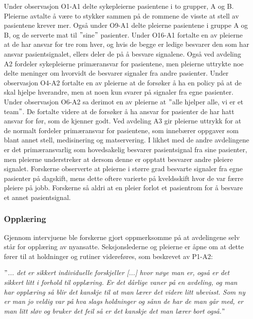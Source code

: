\noindent
Under observasjon O1-A1 delte sykepleierne pasientene i to grupper, A og B. Pleierne avtalte å være to stykker sammen på de rommene de visste at stell av pasientene krever mer. Også under O9-A1 delte pleierne pasientene i gruppe A og B, og de serverte mat til $"$sine$"$ pasienter. Under O16-A1 fortalte en av pleierne at de har ansvar for tre rom hver, og hvis de begge er ledige besvarer den som har ansvar pasientsignalet, ellers deler de på å besvare signalene. Også ved avdeling A2 fordeler sykepleierne primæransvar for pasientene, men pleierne uttrykte noe delte meninger om hvorvidt de besvarer signaler fra andre pasienter. Under observasjon O4-A2 fortalte en av pleierne at de forsøker å ha en policy på at de skal hjelpe hverandre, men at noen kun svarer på signaler fra egne pasienter. Under observasjon O6-A2 sa derimot en av pleierne at $"$alle hjelper alle, vi er et team$"$. De fortalte videre at de forsøker å ha ansvar for pasienter de har hatt ansvar for før, som de kjenner godt. Ved avdeling A3 gir pleierne uttrykk for at de normalt fordeler primæransvar for pasientene, som innebærer oppgaver som blant annet stell, medisinering og matservering. I likhet med de andre avdelingene er det primæransvarlig som hovedsakelig besvarer pasientsignal fra sine pasienter, men pleierne understreker at dersom denne er opptatt besvarer andre pleiere signalet. Forskerne observerte at pleierne i større grad besvarte signaler fra egne pasienter på dagskift, mens dette oftere varierte på kveldsskift hvor de var færre pleiere på jobb. Forskerne så aldri at en pleier forlot et pasientrom for å besvare et annet pasientsignal. 

\subsubsection{Opplæring}
Gjennom intervjuene ble forskerne gjort oppmerksomme på at avdelingene selv står for opplæring av nyansatte. Seksjonslederne og pleierne er åpne om at dette fører til at holdninger og rutiner videreføres, som beskrevet av P1-A2:

\noindent
\textit{$"$... det er sikkert individuelle forskjeller [...] hvor nøye man er, også er det sikkert litt i forhold til opplæring. Er det dårlige vaner på en avdeling, og man har opplæring så blir det kanskje til at man lærer det videre litt ubevisst. Som ny er man jo veldig var på hva slags holdninger og sånn de har de man går med, er man litt sløv og bruker det feil så er det kanskje det man lærer bort også.$"$}

